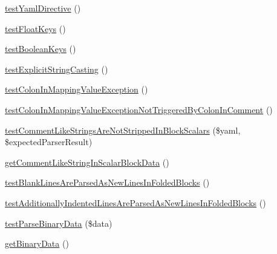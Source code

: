 \begin{DoxyCompactItemize}
\item 
\mbox{\hyperlink{class_symfony_1_1_component_1_1_yaml_1_1_tests_1_1_parser_test_a58b82fb07e01f77ef5cc363d2b39af17}{test\+Yaml\+Directive}} ()
\item 
\mbox{\hyperlink{class_symfony_1_1_component_1_1_yaml_1_1_tests_1_1_parser_test_a83e8f7ed0fa69d629c01bc6bbb9dda8b}{test\+Float\+Keys}} ()
\item 
\mbox{\hyperlink{class_symfony_1_1_component_1_1_yaml_1_1_tests_1_1_parser_test_ac39a168463212f8081096eb5bcbb3869}{test\+Boolean\+Keys}} ()
\item 
\mbox{\hyperlink{class_symfony_1_1_component_1_1_yaml_1_1_tests_1_1_parser_test_a2b528dd81120dd0d63c7b2edd1ab2f8e}{test\+Explicit\+String\+Casting}} ()
\item 
\mbox{\hyperlink{class_symfony_1_1_component_1_1_yaml_1_1_tests_1_1_parser_test_a1f230fdefeb6f19e608839cce77c559c}{test\+Colon\+In\+Mapping\+Value\+Exception}} ()
\item 
\mbox{\hyperlink{class_symfony_1_1_component_1_1_yaml_1_1_tests_1_1_parser_test_a21f36c4a9b6d2e9e66b38949ee55e035}{test\+Colon\+In\+Mapping\+Value\+Exception\+Not\+Triggered\+By\+Colon\+In\+Comment}} ()
\item 
\mbox{\hyperlink{class_symfony_1_1_component_1_1_yaml_1_1_tests_1_1_parser_test_a3943d0e9257d1906a4a72610e1a28a45}{test\+Comment\+Like\+Strings\+Are\+Not\+Stripped\+In\+Block\+Scalars}} (\$yaml, \$expected\+Parser\+Result)
\item 
\mbox{\hyperlink{class_symfony_1_1_component_1_1_yaml_1_1_tests_1_1_parser_test_aaf62a54c36c5c818621ab0c9fc3c6174}{get\+Comment\+Like\+String\+In\+Scalar\+Block\+Data}} ()
\item 
\mbox{\hyperlink{class_symfony_1_1_component_1_1_yaml_1_1_tests_1_1_parser_test_a467f71688ece166e57df91bc2fd578ad}{test\+Blank\+Lines\+Are\+Parsed\+As\+New\+Lines\+In\+Folded\+Blocks}} ()
\item 
\mbox{\hyperlink{class_symfony_1_1_component_1_1_yaml_1_1_tests_1_1_parser_test_a775d28798b98219cc742ebcf50311279}{test\+Additionally\+Indented\+Lines\+Are\+Parsed\+As\+New\+Lines\+In\+Folded\+Blocks}} ()
\item 
\mbox{\hyperlink{class_symfony_1_1_component_1_1_yaml_1_1_tests_1_1_parser_test_ab1cdad2c5d1b326e97e5869124e599be}{test\+Parse\+Binary\+Data}} (\$data)
\item 
\mbox{\hyperlink{class_symfony_1_1_component_1_1_yaml_1_1_tests_1_1_parser_test_afb7f946c9c44d742389e7519763dd22e}{get\+Binary\+Data}} ()
\item 

\end{DoxyCompactItemize}
